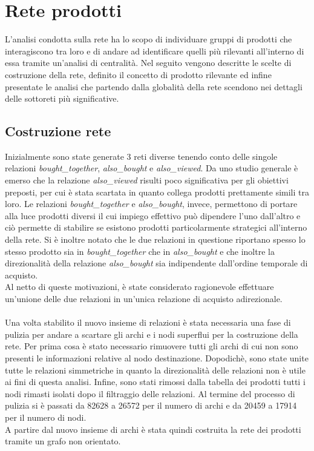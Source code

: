 \section{Rete prodotti}\label{ReteProdotti}
L'analisi condotta sulla rete ha lo scopo di individuare gruppi di prodotti che interagiscono tra loro e di andare ad identificare quelli più rilevanti all'interno di essa tramite un'analisi di centralità. Nel seguito vengono descritte le scelte di costruzione della rete, definito il concetto di prodotto rilevante ed infine presentate le analisi che partendo dalla globalità della rete scendono nei dettagli delle sottoreti più significative. 

\subsection{Costruzione rete}
Inizialmente sono state generate 3 reti diverse tenendo conto delle singole relazioni \textit{bought\_together}, \textit{also\_bought} e \textit{also\_viewed}. Da uno studio generale è emerso che la relazione \textit{also\_viewed} risulti poco significativa per gli obiettivi preposti, per cui è stata scartata in quanto collega prodotti prettamente simili tra loro. Le relazioni \textit{bought\_together} e \textit{also\_bought}, invece, permettono di portare alla luce prodotti diversi il cui impiego effettivo può dipendere l'uno dall'altro e ciò permette di stabilire se esistono prodotti particolarmente strategici all'interno della rete. Si è inoltre notato che le due relazioni in questione riportano spesso lo stesso prodotto sia in \textit{bought\_together} che in \textit{also\_bought} e che inoltre la direzionalità della relazione \textit{also\_bought} sia indipendente dall'ordine temporale di acquisto. \\
Al netto di queste motivazioni, è state considerato ragionevole effettuare un'unione delle due relazioni in un'unica relazione di acquisto adirezionale. 
\\\\
Una volta stabilito il nuovo insieme di relazioni è stata necessaria una fase di pulizia per andare a scartare gli archi e i nodi superflui per la costruzione della rete. Per prima cosa è stato necessario rimuovere tutti gli archi di cui non sono presenti le informazioni relative al nodo destinazione. Dopodichè, sono state unite tutte le relazioni simmetriche in quanto la direzionalità delle relazioni non è utile ai fini di questa analisi. Infine, sono stati rimossi dalla tabella dei prodotti tutti i nodi rimasti isolati dopo il filtraggio delle relazioni. Al termine del processo di pulizia si è passati da 82628 a 26572 per il numero di archi e da 20459 a 17914 per il numero di nodi. \\
A partire dal nuovo insieme di archi è stata quindi costruita la rete dei prodotti tramite un grafo non orientato.



